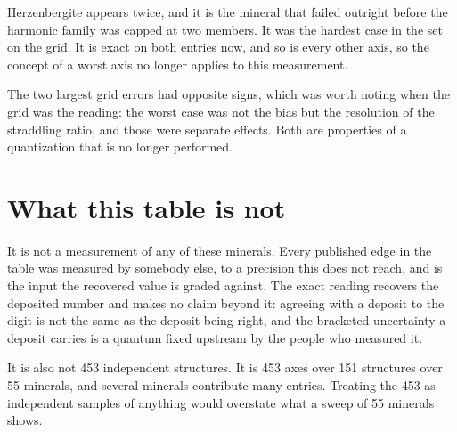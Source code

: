 Herzenbergite appears twice, and it is the mineral that failed outright before the harmonic family was capped at two members. It was the hardest case in the set on the grid. It is exact on both entries now, and so is every other axis, so the concept of a worst axis no longer applies to this measurement.

The two largest grid errors had opposite signs, which was worth noting when the grid was the reading: the worst case was not the bias but the resolution of the straddling ratio, and those were separate effects. Both are properties of a quantization that is no longer performed.

\section{What this table is not}

It is not a measurement of any of these minerals. Every published edge in the table was measured by somebody else, to a precision this does not reach, and is the input the recovered value is graded against. The exact reading recovers the deposited number and makes no claim beyond it: agreeing with a deposit to the digit is not the same as the deposit being right, and the bracketed uncertainty a deposit carries is a quantum fixed upstream by the people who measured it.

It is also not 453 independent structures. It is 453 axes over 151 structures over 55 minerals, and several minerals contribute many entries. Treating the 453 as independent samples of anything would overstate what a sweep of 55 minerals shows.
